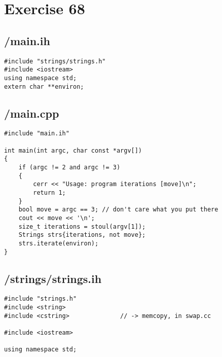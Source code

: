 \documentclass{article}
\begin{document}
\section*{Exercise 68}
\subsection*{/main.ih}
\begin{verbatim}
#include "strings/strings.h"
#include <iostream>
using namespace std;
extern char **environ;

\end{verbatim}
\subsection*{/main.cpp}
\begin{verbatim}
#include "main.ih"

int main(int argc, char const *argv[])
{
    if (argc != 2 and argc != 3)
    {
        cerr << "Usage: program iterations [move]\n";
        return 1;
    }
    bool move = argc == 3; // don't care what you put there
    cout << move << '\n';
    size_t iterations = stoul(argv[1]);
    Strings strs{iterations, not move};
    strs.iterate(environ);
}

\end{verbatim}
\subsection*{/strings/strings.ih}
\begin{verbatim}
#include "strings.h"
#include <string>
#include <cstring>              // -> memcopy, in swap.cc

#include <iostream>

using namespace std;


\end{verbatim}
\end{document}
